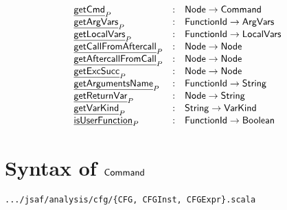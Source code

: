\[
\begin{array}{lcl}
  \underline{\sf getCmd}_{P} & : & \mbox{\textsf{Node}} \rightarrow \mbox{\textsf{Command}} \\
  \underline{\sf getArgVars}_{P} & : & \mbox{\textsf{FunctionId}} \rightarrow \mbox{\textsf{ArgVars}} \\
  \underline{\sf getLocalVars}_{P} & : & \mbox{\textsf{FunctionId}} \rightarrow \mbox{\textsf{LocalVars}} \\
  \underline{\sf getCallFromAftercall}_{P} & : & \mbox{\textsf{Node}} \rightarrow \mbox{\textsf{Node}} \\
  \underline{\sf getAftercallFromCall}_{P} & : & \mbox{\textsf{Node}} \rightarrow \mbox{\textsf{Node}} \\
  \underline{\sf getExcSucc}_{P} & : & \mbox{\textsf{Node}} \rightarrow \mbox{\textsf{Node}} \\
  \underline{\sf getArgumentsName}_{P} & : & \mbox{\textsf{FunctionId}} \rightarrow \mbox{\textsf{String}} \\
  \underline{\sf getReturnVar}_{P} & : & \mbox{\textsf{Node}} \rightarrow \mbox{\textsf{String}} \\
  \underline{\sf getVarKind}_{P} & : & \mbox{\textsf{String}} \rightarrow \mbox{\textsf{VarKind}} \\
  \underline{\sf isUserFunction}_{P} & : & \mbox{\textsf{FunctionId}} \rightarrow \mbox{\textsf{Boolean}} \\
\end{array}
\]
\section{Syntax of $\mbox{\textsf{Command}}$}
{\inblue\tt .../jsaf/analysis/cfg/\{CFG, CFGInst, CFGExpr\}.scala}\\

